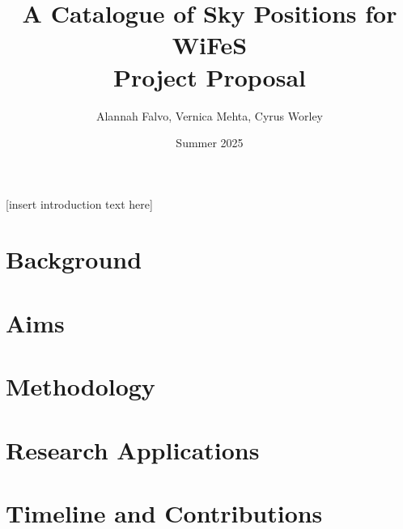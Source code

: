 \documentclass{article}
\title{%
    \huge A Catalogue of Sky Positions for WiFeS \\
    \Large \textbf{Project Proposal}}
\author{Alannah Falvo, Vernica Mehta, Cyrus Worley}
\date{Summer 2025}
\begin{document}
\maketitle

[insert introduction text here] \\

\section {Background}

\section{Aims}

\section{Methodology}

\section{Research Applications}

\section{Timeline and Contributions}

\printbibliography
\end{document}
